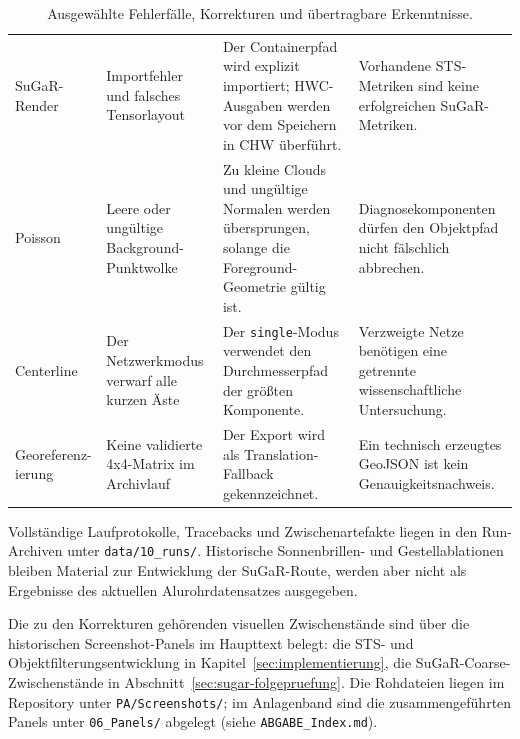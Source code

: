 \begin{table}[H]
\begin{tabularx}{\textwidth}{p{2.6cm}XXX}
SuGaR-Render & Importfehler und falsches Tensorlayout & Der Containerpfad wird
explizit importiert; HWC-Ausgaben werden vor dem Speichern in CHW überführt. &
Vorhandene STS-Metriken sind keine erfolgreichen SuGaR-Metriken.\\
Poisson & Leere oder ungültige Background-Punktwolke & Zu kleine Clouds und
ungültige Normalen werden übersprungen, solange die Foreground-Geometrie gültig
ist. & Diagnosekomponenten dürfen den Objektpfad nicht fälschlich abbrechen.\\
Centerline & Der Netzwerkmodus verwarf alle kurzen Äste & Der
\texttt{single}-Modus verwendet den Durchmesserpfad der größten Komponente. &
Verzweigte Netze benötigen eine getrennte wissenschaftliche Untersuchung.\\
\shortstack{Georeferenz-\\ierung} & Keine validierte 4x4-Matrix im Archivlauf & Der Export wird
als Translation-Fallback gekennzeichnet. & Ein technisch erzeugtes GeoJSON ist
kein Genauigkeitsnachweis.\\
\bottomrule
\end{tabularx}
\caption{Ausgewählte Fehlerfälle, Korrekturen und übertragbare Erkenntnisse.}
\label{tab:fehlerchronik}
\end{table}

Vollständige Laufprotokolle, Tracebacks und Zwischenartefakte liegen in den
Run-Archiven unter \texttt{data/10\_runs/}. Historische Sonnenbrillen- und
Gestellablationen bleiben Material zur Entwicklung der SuGaR-Route, werden aber
nicht als Ergebnisse des aktuellen Alurohrdatensatzes ausgegeben.

Die zu den Korrekturen gehörenden visuellen Zwischenstände sind über die
historischen Screenshot-Panels im Haupttext belegt: die STS- und
Objektfilterungsentwicklung in Kapitel~\ref{sec:implementierung}, die
SuGaR-Coarse-Zwischenstände in Abschnitt~\ref{sec:sugar-folgepruefung}. Die
Rohdateien liegen im Repository unter \texttt{PA/Screenshots/}; im Anlagenband
sind die zusammengeführten Panels unter \texttt{06\_Panels/} abgelegt (siehe
\texttt{ABGABE\_Index.md}).
